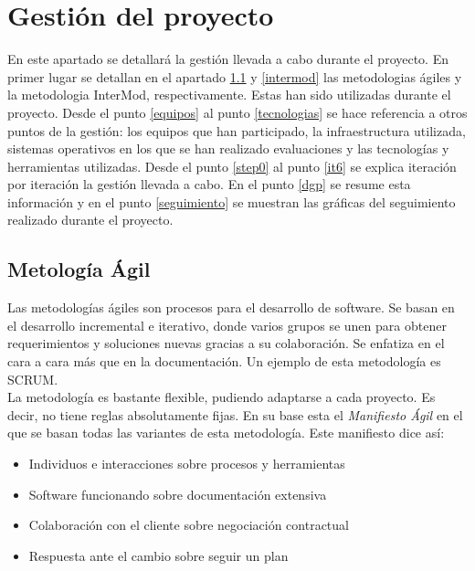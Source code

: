 
\chapter{Gestión del proyecto}
\label{gestion}

En este apartado se detallará la gestión llevada a cabo durante el proyecto. En primer lugar se detallan en el apartado \ref{metodologia-agil} y \ref{intermod} las metodologias ágiles y la metodologia InterMod, respectivamente. Estas han sido utilizadas durante el proyecto. Desde el punto \ref{equipos} al punto \ref{tecnologias} se hace referencia a otros puntos de la gestión: los equipos que han participado, la infraestructura utilizada, sistemas operativos en los que se han realizado evaluaciones y las tecnologías y herramientas utilizadas. Desde el punto \ref{step0} al punto \ref{it6} se explica iteración por iteración la gestión llevada a cabo. En el punto \ref{dgp} se resume esta información y en el punto \ref{seguimiento} se muestran las gráficas del seguimiento realizado durante el proyecto.\\

\section{Metología Ágil}
\label{metodologia-agil}

Las metodologías ágiles son procesos para el desarrollo de software. Se basan en el desarrollo incremental e iterativo, donde varios grupos se unen para obtener requerimientos y soluciones nuevas gracias a su colaboración. Se enfatiza en el cara a cara más que en la documentación. Un ejemplo de esta metodología es SCRUM.\\

La metodología es bastante flexible, pudiendo adaptarse a cada proyecto. Es decir, no tiene reglas absolutamente fijas. En su base esta el \textit{Manifiesto Ágil} en el que se basan todas las variantes de esta metodología. Este manifiesto \hyperref[manifiestoagil]{\cite{manifiestoagil}} dice así:

\begin{itemize}
\item Individuos e interacciones sobre procesos y herramientas
\item Software funcionando sobre documentación extensiva
\item Colaboración con el cliente sobre negociación contractual
\item Respuesta ante el cambio sobre seguir un plan
\end{itemize}

